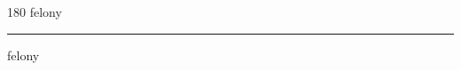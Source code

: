 
\begin{frame}
\begin{center}
\begin{turn}{180}
{\fontsize{2.5cm}{1em}\selectfont felony}
\end{turn}
\vspace{1em}\par  
\hrule
\vspace{1em}\par  
{\fontsize{2.5cm}{1em}\selectfont felony}
\end{center}
\end{frame}
